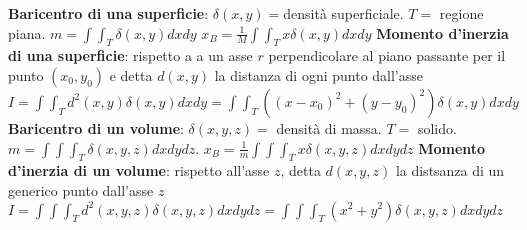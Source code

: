 \documentclass[fontsize=8pt]{scrartcl}
\begin{document}
\begin{multicols*}{4}
\textbf{Baricentro di una superficie}: \newline
$\delta(x,y) = $densità superficiale.\newline
$T =$ regione piana.\newline
$m = \int \int_T \delta(x,y) dx dy$\newline
$x_B = \frac{1}{M} \int \int_T x \delta(x,y) dx dy$\newline
\textbf{Momento d'inerzia di una superficie}:\newline
rispetto a a un asse $r$ perpendicolare al piano passante per  il punto $(x_0,y_0)$ e detta $d(x,y)$ la distanza di ogni punto dall'asse \newline
$I = \int \int_T  d^2 (x,y) \delta(x,y) dx dy = \int \int_T ((x-x_0)^2 + (y-y_0)^2) \delta(x,y) dx dy$\newline
\textbf{Baricentro di un volume}:\newline
$\delta (x,y,z) =$ densità di massa.\newline
$T =$ solido.\newline
$m = \int \int \int_T \delta(x,y,z) dx dy dz$.\newline
$x_B = \frac{1}{m} \int \int \int_T x \delta(x,y,z) dx dy dz$\newline
\textbf{Momento d'inerzia di un volume}:\newline
rispetto all'asse $z$, detta $d(x,y,z)$ la distsanza di un generico punto dall'asse $z$\newline
$I = \int \int \int_T d^2(x,y,z) \delta(x,y,z) dx dy dz = \int \int \int_T (x^2 + y^2) \delta(x,y,z) dx dy dz$

\end{multicols*}
\end{document}

